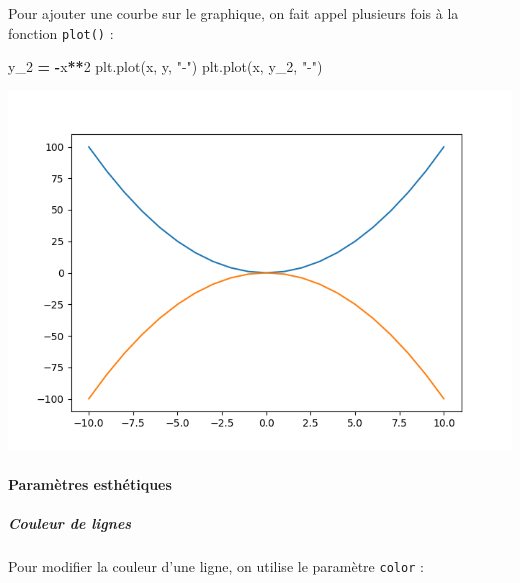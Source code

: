 \documentclass[12pt,]{book}
\newenvironment{Shaded}{\begin{snugshade}}{\end{snugshade}}
\newcommand{\DecValTok}[1]{\textcolor[rgb]{0.00,0.00,0.81}{#1}}
\newcommand{\StringTok}[1]{\textcolor[rgb]{0.31,0.60,0.02}{#1}}
\newcommand{\OperatorTok}[1]{\textcolor[rgb]{0.81,0.36,0.00}{\textbf{#1}}}
\newcommand{\NormalTok}[1]{#1}
\let\oldparagraph\paragraph
\renewcommand{\paragraph}[1]{\oldparagraph{#1}\mbox{}}
\let\oldsubparagraph\subparagraph
\renewcommand{\subparagraph}[1]{\oldsubparagraph{#1}\mbox{}}
\numberwithin{equation}{section}
\numberwithin{countremarque}{section}
\begin{document}
Pour ajouter une courbe sur le graphique, on fait appel plusieurs fois à
la fonction \texttt{plot()} :

\begin{Shaded}
\begin{Highlighting}[]
\NormalTok{y_2 }\OperatorTok{=} \OperatorTok{-}\NormalTok{x}\OperatorTok{**}\DecValTok{2}
\NormalTok{plt.plot(x, y, }\StringTok{"-"}\NormalTok{)}
\NormalTok{plt.plot(x, y_2, }\StringTok{"-"}\NormalTok{)}
\end{Highlighting}
\end{Shaded}

\begin{center}\includegraphics[width=9.03in]{figs/pyplot/lignes_2_courbes} \end{center}

\paragraph{Paramètres esthétiques}\label{parametres-esthetiques}

\subparagraph{Couleur de lignes}\label{couleur-de-lignes}

Pour modifier la couleur d'une ligne, on utilise le paramètre
\texttt{color} :

\begin{Shaded}
\end{Shaded}
\end{document}
